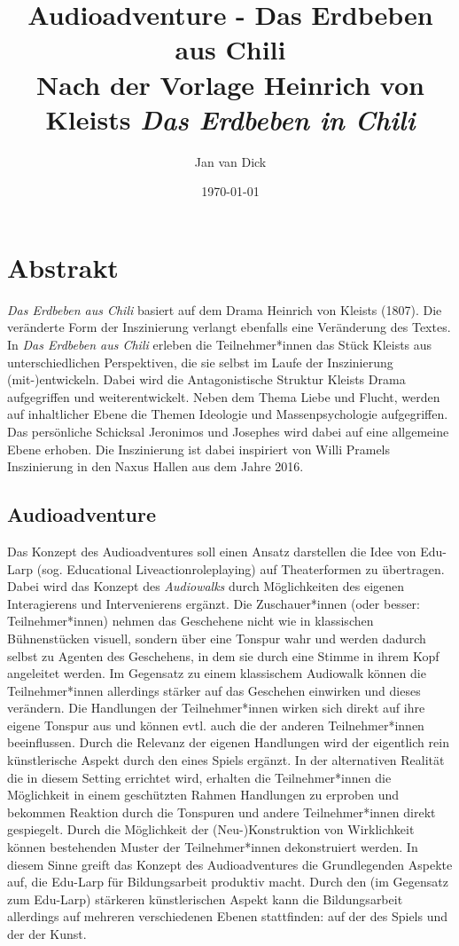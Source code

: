 \documentclass[a4paper, 12pt]{report}
\title{%
    Audioadventure - Das Erdbeben aus Chili \\
    \large Nach der Vorlage Heinrich von Kleists \textit{Das Erdbeben in Chili}}
\author{Jan van Dick}
\date{\today}
\newcommand\frontmatter{ \cleardoublepage \pagenumbering{roman}}
\begin{document}
\maketitle
\frontmatter


\chapter*{Abstrakt}
\textit{Das Erdbeben aus Chili} basiert auf dem Drama Heinrich von Kleists (1807). 
Die veränderte Form der Inszinierung verlangt ebenfalls eine Veränderung des Textes. 
In \textit{Das Erdbeben aus Chili} erleben die Teilnehmer*innen das Stück Kleists aus unterschiedlichen Perspektiven, die sie selbst im Laufe der Inszinierung (mit-)entwickeln.
Dabei wird die Antagonistische Struktur Kleists Drama aufgegriffen und weiterentwickelt. 
Neben dem Thema Liebe und Flucht, werden auf inhaltlicher Ebene die Themen Ideologie und Massenpsychologie aufgegriffen. 
Das persönliche Schicksal Jeronimos und Josephes wird dabei auf eine allgemeine Ebene erhoben.
Die Inszinierung ist dabei inspiriert von Willi Pramels Inszinierung in den Naxus Hallen aus dem Jahre 2016.

\section*{Audioadventure}
Das Konzept des \glqq Audioadventures\grqq{} soll einen Ansatz darstellen die Idee von Edu-Larp (sog. Educational Liveactionroleplaying) auf Theaterformen zu übertragen. 
Dabei wird das Konzept des \textit{Audiowalks} durch Möglichkeiten des eigenen Interagierens und Intervenierens ergänzt.
Die Zuschauer*innen (oder besser: Teilnehmer*innen) nehmen das Geschehene nicht wie in klassischen Bühnenstücken visuell, sondern über eine Tonspur wahr und werden dadurch selbst zu Agenten des Geschehens, in dem sie durch eine \glqq Stimme in ihrem Kopf\grqq{} angeleitet werden.
Im Gegensatz zu einem \glqq klassischem\grqq{} Audiowalk können die Teilnehmer*innen allerdings stärker auf das Geschehen einwirken und dieses verändern. 
Die Handlungen der Teilnehmer*innen wirken sich direkt auf ihre eigene Tonspur aus und können evtl. auch die der anderen Teilnehmer*innen beeinflussen.
Durch die Relevanz der eigenen Handlungen wird der eigentlich rein künstlerische Aspekt durch den eines Spiels ergänzt.
In der alternativen Realität die in diesem Setting errichtet wird, erhalten die Teilnehmer*innen die Möglichkeit in einem geschützten Rahmen Handlungen zu erproben und bekommen Reaktion durch die Tonspuren und andere Teilnehmer*innen direkt gespiegelt.
Durch die Möglichkeit der (Neu-)Konstruktion von Wirklichkeit können bestehenden Muster der Teilnehmer*innen dekonstruiert werden.
In diesem Sinne greift das Konzept des Audioadventures die Grundlegenden Aspekte auf, die Edu-Larp für Bildungsarbeit produktiv macht.
Durch den (im Gegensatz zum Edu-Larp) stärkeren künstlerischen Aspekt kann die Bildungsarbeit allerdings auf mehreren verschiedenen Ebenen stattfinden: auf der des Spiels und der der Kunst. 
\end{document}
